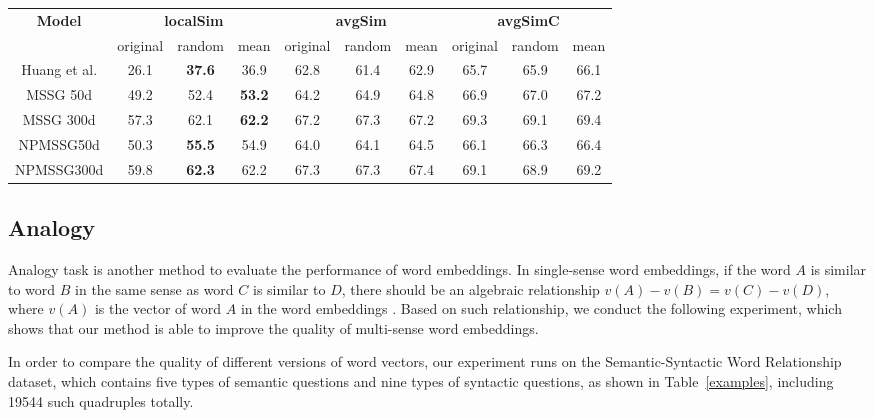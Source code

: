 \documentclass[11pt]{article}
\begin{document}
 \begin{center}
 \begin{tabular}{|c|ccc|ccc|ccc|}
 \hline
 \multirow{1}{*}{\textbf{Model}} &\multicolumn{3}{c}{\textbf{localSim}} & \multicolumn{3}{|c|}{\textbf{avgSim}}  & \multicolumn{3}{c|}{\textbf{avgSimC}} \\
 & original & random & mean & original & random & mean & original & random & mean\\
 \hline 
 Huang et al.  & 26.1 & \textbf{37.6} & 36.9 & 62.8& 61.4 & 62.9 &65.7 & 65.9 & 66.1\\
 MSSG 50d & 49.2 & 52.4 & \textbf{53.2} & 64.2 & 64.9 &  64.8& 66.9 & 67.0 & 67.2\\
 MSSG 300d & 57.3 & 62.1 & \textbf{62.2} & 67.2& 67.3 & 67.2 & 69.3 & 69.1 & 69.4\\
 NPMSSG50d & 50.3 & \textbf{55.5} & 54.9 & 64.0 & 64.1 &64.5 & 66.1 & 66.3& 66.4\\
 NPMSSG300d & 59.8 & \textbf{62.3} & 62.2 & 67.3 & 67.3 & 67.4 &69.1& 68.9& 69.2\\
 \hline
 \end{tabular}
 \end{center}
 \subsection{Analogy}
 
 \par 
  Analogy task is another method to evaluate the performance of word embeddings. In single-sense word embeddings, if the word $A$ is similar to word $B$ in the same sense as word $C$ is similar to $D$, there should be an algebraic relationship $v(A)-v(B)=v(C)-v(D)$, where $v(A)$ is the vector of word $A$ in the word embeddings \cite{mikolov2013efficient}. Based on such relationship, we conduct the following experiment, which shows that our method is able to improve the quality of multi-sense word embeddings.
  \par
  In order to compare the quality of different versions of word vectors, our experiment runs on the Semantic-Syntactic Word Relationship dataset, which contains five types of semantic questions and nine types of syntactic questions, as shown in Table~\ref{examples}, including 19544 such quadruples totally.
  
\end{document}
